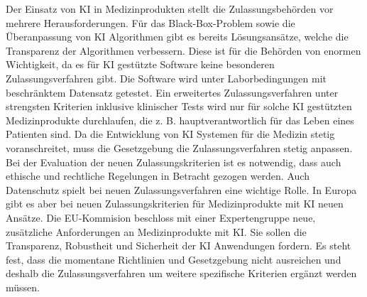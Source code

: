 Der Einsatz von KI in Medizinprodukten stellt die Zulassungsbehörden vor mehrere Herausforderungen. Für das Black-Box-Problem sowie die Überanpassung von KI Algorithmen gibt es bereits Lösungsansätze, welche die Transparenz der Algorithmen verbessern. Diese ist für die Behörden von enormen Wichtigkeit, da es für KI gestützte Software keine besonderen Zulassungsverfahren gibt. Die Software wird unter Laborbedingungen mit beschränktem Datensatz getestet. Ein erweitertes  Zulassungsverfahren unter strengsten Kriterien inklusive klinischer Tests wird nur für solche KI gestützten Medizinprodukte durchlaufen, die z. B. hauptverantwortlich für das Leben eines Patienten sind.
Da die Entwicklung von KI Systemen für die Medizin stetig voranschreitet, muss die Gesetzgebung die Zulassungsverfahren stetig anpassen. Bei der Evaluation der neuen Zulassungskriterien ist es notwendig, dass auch ethische und rechtliche Regelungen in Betracht gezogen werden. Auch Datenschutz spielt bei neuen Zulassungsverfahren eine wichtige Rolle. 
In Europa gibt es aber bei neuen Zulassungskriterien für Medizinprodukte mit KI neuen Ansätze. Die EU-Kommision beschloss mit einer Expertengruppe neue, zusätzliche Anforderungen an Medizinprodukte mit KI. Sie sollen die Transparenz, Robustheit und Sicherheit der KI Anwendungen fordern. Es steht fest, dass die momentane Richtlinien und Gesetzgebung nicht ausreichen und deshalb die Zulassungsverfahren um weitere spezifische Kriterien ergänzt werden müssen.